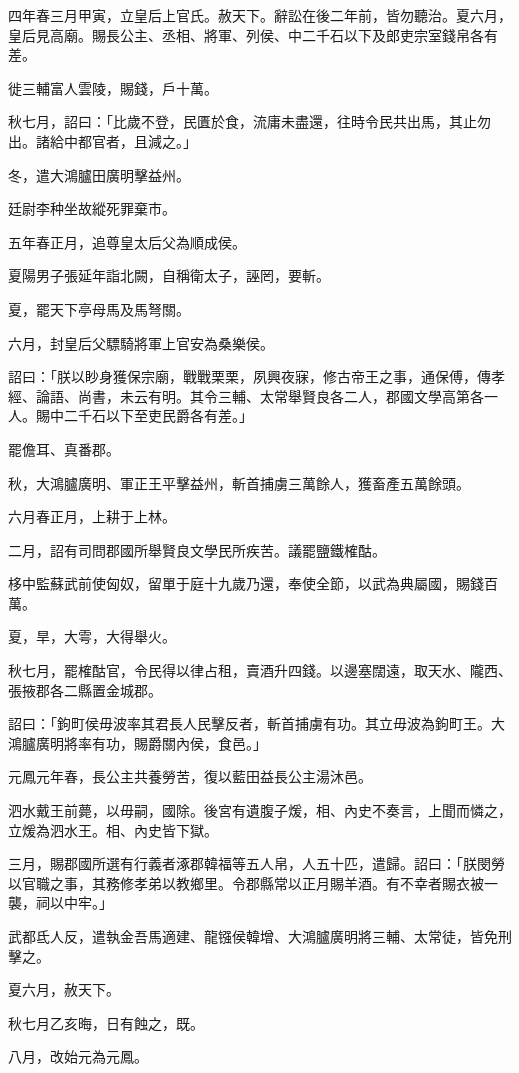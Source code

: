 \begin{pinyinscope}
四年春三月甲寅，立皇后上官氏。赦天下。辭訟在後二年前，皆勿聽治。夏六月，皇后見高廟。賜長公主、丞相、將軍、列侯、中二千石以下及郎吏宗室錢帛各有差。

徙三輔富人雲陵，賜錢，戶十萬。

秋七月，詔曰：「比歲不登，民匱於食，流庸未盡還，往時令民共出馬，其止勿出。諸給中都官者，且減之。」

冬，遣大鴻臚田廣明擊益州。

廷尉李种坐故縱死罪棄市。

五年春正月，追尊皇太后父為順成侯。

夏陽男子張延年詣北闕，自稱衛太子，誣罔，要斬。

夏，罷天下亭母馬及馬弩關。

六月，封皇后父驃騎將軍上官安為桑樂侯。

詔曰：「朕以眇身獲保宗廟，戰戰栗栗，夙興夜寐，修古帝王之事，通保傅，傳孝經、論語、尚書，未云有明。其令三輔、太常舉賢良各二人，郡國文學高第各一人。賜中二千石以下至吏民爵各有差。」

罷儋耳、真番郡。

秋，大鴻臚廣明、軍正王平擊益州，斬首捕虜三萬餘人，獲畜產五萬餘頭。

六月春正月，上耕于上林。

二月，詔有司問郡國所舉賢良文學民所疾苦。議罷鹽鐵榷酤。

栘中監蘇武前使匈奴，留單于庭十九歲乃還，奉使全節，以武為典屬國，賜錢百萬。

夏，旱，大雩，大得舉火。

秋七月，罷榷酤官，令民得以律占租，賣酒升四錢。以邊塞闊遠，取天水、隴西、張掖郡各二縣置金城郡。

詔曰：「鉤町侯毋波率其君長人民擊反者，斬首捕虜有功。其立毋波為鉤町王。大鴻臚廣明將率有功，賜爵關內侯，食邑。」

元鳳元年春，長公主共養勞苦，復以藍田益長公主湯沐邑。

泗水戴王前薨，以毋嗣，國除。後宮有遺腹子煖，相、內史不奏言，上聞而憐之，立煖為泗水王。相、內史皆下獄。

三月，賜郡國所選有行義者涿郡韓福等五人帛，人五十匹，遣歸。詔曰：「朕閔勞以官職之事，其務修孝弟以教鄉里。令郡縣常以正月賜羊酒。有不幸者賜衣被一襲，祠以中牢。」

武都氐人反，遣執金吾馬適建、龍镪侯韓增、大鴻臚廣明將三輔、太常徒，皆免刑擊之。

夏六月，赦天下。

秋七月乙亥晦，日有蝕之，既。

八月，改始元為元鳳。


\end{pinyinscope}
